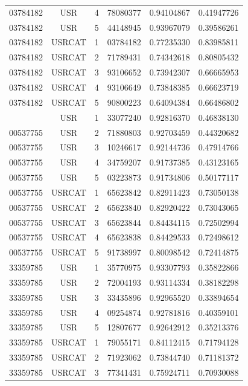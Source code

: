 \begin{longtable}{cccccc}
03784182 & USR    & 4 & 78080377 & 0.94104867 & 0.41947726\\
03784182 & USR    & 5 & 44148945 & 0.93967079 & 0.39586261\\
03784182 & USRCAT & 1 & 03784182 & 0.77235330 & 0.83985811\\%
03784182 & USRCAT & 2 & 71789431 & 0.74342618 & 0.80805432\\
03784182 & USRCAT & 3 & 93106652 & 0.73942307 & 0.66665953\\
03784182 & USRCAT & 4 & 93106649 & 0.73848385 & 0.66623719\\
03784182 & USRCAT & 5 & 90800223 & 0.64094384 & 0.66486802\\
\hline
\pagebreak
00537755 & USR    & 1 & 33077240 & 0.92816370 & 0.46838130\\%
00537755 & USR    & 2 & 71880803 & 0.92703459 & 0.44320682\\
00537755 & USR    & 3 & 10246617 & 0.92144736 & 0.47914766\\
00537755 & USR    & 4 & 34759207 & 0.91737385 & 0.43123165\\
00537755 & USR    & 5 & 03223873 & 0.91734806 & 0.50177117\\
00537755 & USRCAT & 1 & 65623842 & 0.82911423 & 0.73050138\\%
00537755 & USRCAT & 2 & 65623840 & 0.82920422 & 0.73043065\\
00537755 & USRCAT & 3 & 65623844 & 0.84434115 & 0.72502994\\
00537755 & USRCAT & 4 & 65623838 & 0.84429533 & 0.72498612\\
00537755 & USRCAT & 5 & 91738997 & 0.80098542 & 0.72414875\\
\hline
33359785 & USR    & 1 & 35770975 & 0.93307793 & 0.35822866\\%
33359785 & USR    & 2 & 72004193 & 0.93114334 & 0.38182298\\
33359785 & USR    & 3 & 33435896 & 0.92965520 & 0.33894654\\
33359785 & USR    & 4 & 09254874 & 0.92781816 & 0.40359101\\
33359785 & USR    & 5 & 12807677 & 0.92642912 & 0.35213376\\
33359785 & USRCAT & 1 & 79055171 & 0.84112415 & 0.71794128\\%
33359785 & USRCAT & 2 & 71923062 & 0.73844740 & 0.71181372\\
33359785 & USRCAT & 3 & 77341431 & 0.75924711 & 0.70930088\\

\end{longtable}
